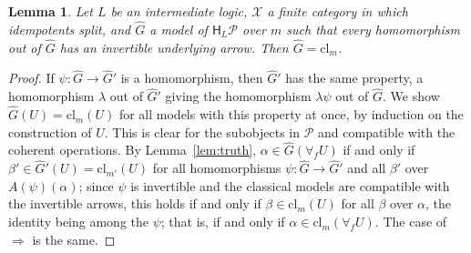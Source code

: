\documentclass[11pt]{amsart}
\newtheorem{lem}[thm]{Lemma}
\theoremstyle{definition}
\newcommand{\HH}{\mathsf H}
\newcommand{\cX}{\mathcal X}
\newcommand{\cP}{\mathcal P}
\begin{document}
\begin{lem}\label{lem:classical}
Let $L$ be an intermediate logic, $\cX$ a finite category in which
idempotents split, and $\hat G$ a model of $\HH_L\cP$ over $m$ such
that every homomorphism out of $\hat G$ has an invertible underlying
arrow. Then $\hat G=\mathrm{cl}_m$.
\end{lem}
\begin{proof}
If $\psi\colon\hat G\to\hat G'$ is a homomorphism, then $\hat G'$ has
the same property, a homomorphism $\lambda$ out of $\hat G'$ giving
the homomorphism $\lambda\psi$ out of $\hat G$. We show $\hat G(U)=
\mathrm{cl}_m(U)$ for all models with this property at once, by
induction on the construction of $U$. This is clear for the subobjects
in $\cP$ and compatible with the coherent operations. By
Lemma~\ref{lem:truth}, $\alpha\in\hat G(\forall_fU)$ if and only if
$\beta'\in\hat G'(U)=\mathrm{cl}_{m'}(U)$ for all homomorphisms $\psi
\colon\hat G\to\hat G'$ and all $\beta'$ over $A(\psi)(\alpha)$; since
$\psi$ is invertible and the classical models are compatible with the
invertible arrows, this holds if and only if $\beta\in\mathrm{cl}_m(U)$
for all $\beta$ over $\alpha$, the identity being among the $\psi$;
that is, if and only if $\alpha\in\mathrm{cl}_m(\forall_fU)$. The case
of $\Rightarrow$ is the same.
\end{proof}
\end{document}
